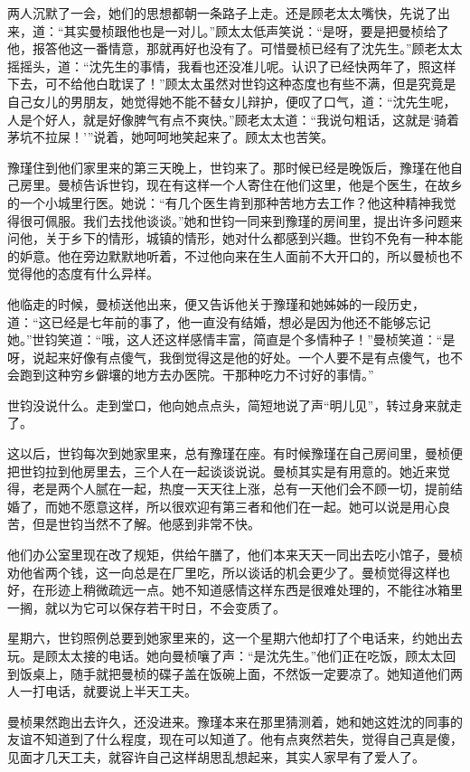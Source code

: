 \par 两人沉默了一会，她们的思想都朝一条路子上走。还是顾老太太嘴快，先说了出来，道：“其实曼桢跟他也是一对儿。”顾太太低声笑说：“是呀，要是把曼桢给了他，报答他这一番情意，那就再好也没有了。可惜曼桢已经有了沈先生。”顾老太太摇摇头，道：“沈先生的事情，我看也还没准儿呢。认识了已经快两年了，照这样下去，可不给他白耽误了！”顾太太虽然对世钧这种态度也有些不满，但是究竟是自己女儿的男朋友，她觉得她不能不替女儿辩护，便叹了口气，道：“沈先生呢，人是个好人，就是好像脾气有点不爽快。”顾老太太道：“我说句粗话，这就是‘骑着茅坑不拉屎！’”说着，她呵呵地笑起来了。顾太太也苦笑。
\par 豫瑾住到他们家里来的第三天晚上，世钧来了。那时候已经是晚饭后，豫瑾在他自己房里。曼桢告诉世钧，现在有这样一个人寄住在他们这里，他是个医生，在故乡的一个小城里行医。她说：“有几个医生肯到那种苦地方去工作？他这种精神我觉得很可佩服。我们去找他谈谈。”她和世钧一同来到豫瑾的房间里，提出许多问题来问他，关于乡下的情形，城镇的情形，她对什么都感到兴趣。世钧不免有一种本能的妒意。他在旁边默默地听着，不过他向来在生人面前不大开口的，所以曼桢也不觉得他的态度有什么异样。
\par 他临走的时候，曼桢送他出来，便又告诉他关于豫瑾和她姊姊的一段历史，道：“这已经是七年前的事了，他一直没有结婚，想必是因为他还不能够忘记她。”世钧笑道：“哦，这人还这样感情丰富，简直是个多情种子！”曼桢笑道：“是呀，说起来好像有点傻气，我倒觉得这是他的好处。一个人要不是有点傻气，也不会跑到这种穷乡僻壤的地方去办医院。干那种吃力不讨好的事情。”
\par 世钧没说什么。走到堂口，他向她点点头，简短地说了声“明儿见”，转过身来就走了。
\par 这以后，世钧每次到她家里来，总有豫瑾在座。有时候豫瑾在自己房间里，曼桢便把世钧拉到他房里去，三个人在一起谈谈说说。曼桢其实是有用意的。她近来觉得，老是两个人腻在一起，热度一天天往上涨，总有一天他们会不顾一切，提前结婚了，而她不愿意这样，所以很欢迎有第三者和他们在一起。她可以说是用心良苦，但是世钧当然不了解。他感到非常不快。
\par 他们办公室里现在改了规矩，供给午膳了，他们本来天天一同出去吃小馆子，曼桢劝他省两个钱，这一向总是在厂里吃，所以谈话的机会更少了。曼桢觉得这样也好，在形迹上稍微疏远一点。她不知道感情这样东西是很难处理的，不能往冰箱里一搁，就以为它可以保存若干时日，不会变质了。
\par 星期六，世钧照例总要到她家里来的，这一个星期六他却打了个电话来，约她出去玩。是顾太太接的电话。她向曼桢嚷了声：“是沈先生。”他们正在吃饭，顾太太回到饭桌上，随手就把曼桢的碟子盖在饭碗上面，不然饭一定要凉了。她知道他们两人一打电话，就要说上半天工夫。
\par 曼桢果然跑出去许久，还没进来。豫瑾本来在那里猜测着，她和她这姓沈的同事的友谊不知道到了什么程度，现在可以知道了。他有点爽然若失，觉得自己真是傻，见面才几天工夫，就容许自己这样胡思乱想起来，其实人家早有了爱人了。
